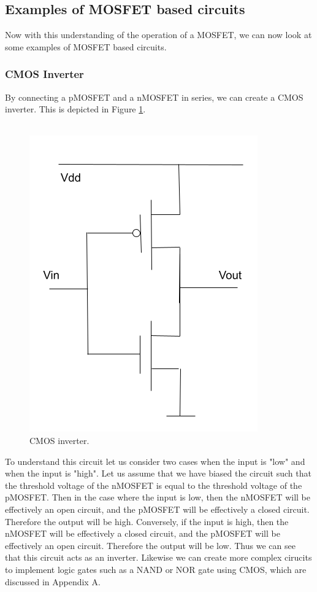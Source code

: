 \documentclass[
  reprint,
  amsmath,amssymb,
  aps
]{revtex4-1}
\begin{document}
\subsection{\label{sec:level2}Examples of MOSFET based circuits}
Now with this understanding of the operation of a MOSFET, we can now look at some examples of MOSFET based circuits.
\subsubsection{\label{sec:level3}CMOS Inverter}
By connecting a pMOSFET and a nMOSFET in series, we can create a CMOS inverter. This is depicted in Figure \ref{fig:cmos inverter}.\\\\
\begin{figure}[H]
    \centering
    \includegraphics[width=0.75\linewidth]{cmos_inverter.png}
    \caption{CMOS inverter.}
    \label{fig:cmos inverter}
\end{figure}
To understand this circuit let us consider two cases when the input is "low" and when the input is "high". Let us assume that 
we have biased the circuit such that the threshold voltage of the nMOSFET is equal to the threshold voltage of the pMOSFET. Then in the 
case where the input is low, then the nMOSFET will be effectively an open circuit, and the pMOSFET will be effectively a closed circuit. Therefore the output will be high. 
Conversely, if the input is high, then the nMOSFET will be effectively a closed circuit, and the pMOSFET will be effectively an open circuit. 
Therefore the output will be low. Thus we can see that this circuit acts as an inverter. Likewise we can create more 
complex cirucits to implement logic gates such as a NAND or NOR gate using CMOS, which are discussed in Appendix A.
\end{document}
